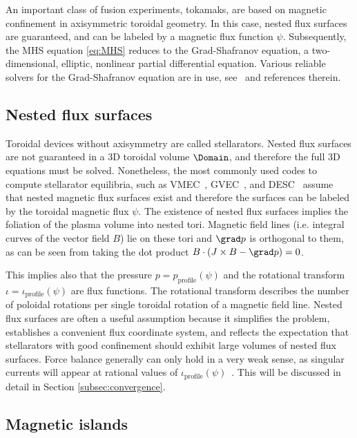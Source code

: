 \documentclass[%
 reprint,
 superscriptaddress,
 amsmath,amssymb,
 aps, nofootinbib, floatfix]{revtex4-2}
\begin{document}
An important class of fusion experiments, tokamaks, are based on magnetic confinement in axisymmetric toroidal geometry. In this case, nested flux surfaces are guaranteed, and can be labeled by a magnetic flux function $\psi$. Subsequently, the MHS equation \eqref{eq:MHS} reduces to the Grad-Shafranov equation, a two-dimensional, elliptic, nonlinear partial differential equation. Various reliable solvers for the Grad-Shafranov equation are in use, see~\cite{hansen_tokamaker_2024} and references therein.   

\subsection{Nested flux surfaces}
\label{subsec:nested_flux_surfaces}
Toroidal devices without axisymmetry are called stellarators. Nested flux surfaces are not guaranteed in a 3D toroidal volume $\Domain$, and therefore the full 3D equations must be solved.
%
Nonetheless, the most commonly used codes to compute stellarator equilibria, such as {VMEC}~\citep{hirshman_steepest-descent_1983, schilling2025numericsvmecpp, Jorge_VMEX_a_differentiable_2026}, {GVEC}~\citep{hindenlang_computing_2025, Hindenlang2026}, and {DESC}~\cite{dudt_desc_2020} assume that nested magnetic flux surfaces exist and therefore the surfaces can be labeled by the toroidal magnetic flux $\psi$. The existence of nested flux surfaces implies the foliation of the plasma volume into nested tori. Magnetic field lines (i.e. integral curves of the vector field $B$) lie on these tori and $\grad p$ is orthogonal to them, as can be seen from taking the dot product $B \cdot (J \times B - \grad p) = 0$.

This implies also that the pressure $p = p_{\mathrm{profile}}(\psi)$ and the rotational transform $\iota = \iota_{\mathrm{profile}}(\psi)$ are flux functions.
The rotational transform describes the number of poloidal rotations per single toroidal rotation of a magnetic field line. Nested flux surfaces are often a useful assumption because it simplifies the problem, establishes a convenient flux coordinate system, and reflects the expectation that stellarators with good confinement should exhibit large volumes of nested flux surfaces.
%
Force balance generally can only hold in a very weak sense, as singular currents will appear at rational values of $\iota_{\mathrm{profile}}(\psi)$~\cite{loizu_magnetic_2015, lazerson_verification_2016}. This will be discussed in detail in Section \ref{subsec:convergence}.

\subsection{Magnetic islands}
\label{subsec:magnetic_islands}
\end{document}
